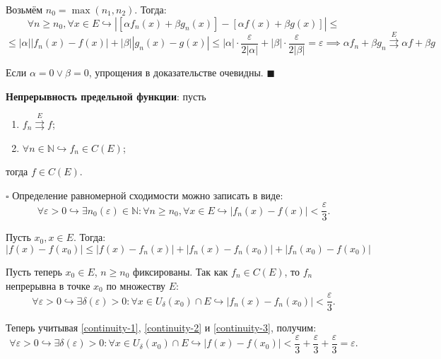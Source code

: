 \documentclass[12pt, a4paper, reqno]{article}
\begin{document}
    Возьмём $n_0 = \max(n_1, n_2)$. Тогда:
    \begin{equation*}
        \forall n \geq n_0, \forall x \in E \hookrightarrow
        |[\alpha f_n(x) + \beta g_n(x)] - [\alpha f(x) + \beta g(x)]| \leq
    \end{equation*}
    \begin{equation*}
        \leq |\alpha||f_n(x) - f(x)| + |\beta||g_n(x) - g(x)| \leq
        |\alpha| \cdot \frac{\varepsilon}{2|\alpha|} + |\beta| \cdot \frac{\varepsilon}{2|\beta|} =
        \varepsilon \implies
        \alpha f_n + \beta g_n \overset{E}{\rightrightarrows} \alpha f + \beta g
    \end{equation*}

    Если $\alpha = 0 \vee \beta = 0$, упрощения в доказательстве очевидны.
    $\blacksquare$

    \textbf{Непрерывность предельной функции}: пусть
    \begin{enumerate}
        \item $f_n \overset{E}{\rightrightarrows} f$;
        \item $\forall n \in \mathbb{N} \hookrightarrow f_n \in C(E)$;
    \end{enumerate}
    тогда $f \in C(E)$.

    $\square$
    Определение равномерной сходимости можно записать в виде:
    \begin{equation}\label{continuity-1}
        \forall \varepsilon > 0 \hookrightarrow \exists n_0(\varepsilon) \in \mathbb{N}: \forall n \geq n_0,
        \forall x \in E \hookrightarrow |f_n(x) - f(x)| < \frac{\varepsilon}{3}.
    \end{equation}

    Пусть $x_0, x \in E$. Тогда:
    \begin{equation}\label{continuity-2}
        |f(x) - f(x_0)| \leq |f(x) - f_n(x)| + |f_n(x) - f_n(x_0)| + |f_n(x_0) - f(x_0)|
    \end{equation}

    Пусть теперь $x_0 \in E$, $n \geq n_0$ фиксированы. Так как $f_n \in C(E)$, то $f_n$ непрерывна
    в точке $x_0$ по множеству $E$:
    \begin{equation}\label{continuity-3}
        \forall \varepsilon > 0 \hookrightarrow \exists \delta(\varepsilon) > 0:
        \forall x \in U_{\delta}(x_0) \cap E \hookrightarrow |f_n(x) - f_n(x_0)| < \frac{\varepsilon}{3}.
    \end{equation}

    Теперь учитывая \eqref{continuity-1}, \eqref{continuity-2} и \eqref{continuity-3}, получим:
    \begin{equation*}
        \forall \varepsilon > 0 \hookrightarrow \exists \delta(\varepsilon) > 0:
        \forall x \in U_{\delta}(x_0) \cap E \hookrightarrow |f(x) - f(x_0)| <
        \frac{\varepsilon}{3} + \frac{\varepsilon}{3} + \frac{\varepsilon}{3} = \varepsilon.
    \end{equation*}
\end{document}
